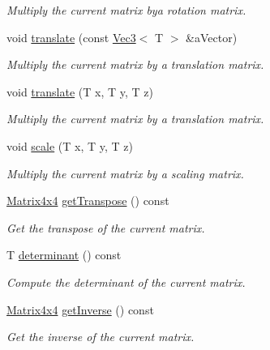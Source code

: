 \begin{DoxyCompactItemize}
\begin{DoxyCompactList}\small\item\em Multiply the current matrix bya rotation matrix. \end{DoxyCompactList}\item 
void \hyperlink{class_math_1_1_matrix4x4_a2d75f36ee9a6ea53a8076b3cbdb7e145}{translate} (const \hyperlink{class_math_1_1_vec3}{Vec3}$<$ T $>$ \&aVector)
\begin{DoxyCompactList}\small\item\em Multiply the current matrix by a translation matrix. \end{DoxyCompactList}\item 
void \hyperlink{class_math_1_1_matrix4x4_a8b0f384bde7fc1046c981041d765f6da}{translate} (T x, T y, T z)
\begin{DoxyCompactList}\small\item\em Multiply the current matrix by a translation matrix. \end{DoxyCompactList}\item 
void \hyperlink{class_math_1_1_matrix4x4_ad1cd9ed038b29313633cc64b69e41bbd}{scale} (T x, T y, T z)
\begin{DoxyCompactList}\small\item\em Multiply the current matrix by a scaling matrix. \end{DoxyCompactList}\item 
\hyperlink{class_math_1_1_matrix4x4}{Matrix4x4} \hyperlink{class_math_1_1_matrix4x4_a123ac83bf7a9556cd7d95b9986fcca4a}{getTranspose} () const 
\begin{DoxyCompactList}\small\item\em Get the transpose of the current matrix. \end{DoxyCompactList}\item 
T \hyperlink{class_math_1_1_matrix4x4_a3fb58a8268bb16463d50e518c57e3cd7}{determinant} () const 
\begin{DoxyCompactList}\small\item\em Compute the determinant of the current matrix. \end{DoxyCompactList}\item 
\hyperlink{class_math_1_1_matrix4x4}{Matrix4x4} \hyperlink{class_math_1_1_matrix4x4_addc6d97c036220363c98220cf5fc8630}{getInverse} () const 
\begin{DoxyCompactList}\small\item\em Get the inverse of the current matrix. \end{DoxyCompactList}\item 

\end{DoxyCompactItemize}
